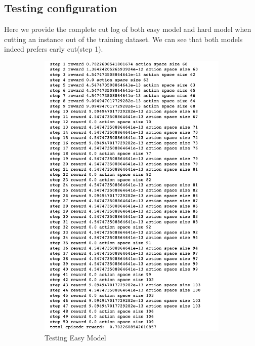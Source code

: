 \documentclass{article}
\begin{document}
\subsection{Testing configuration}
Here we provide the complete cut log of both easy model and hard model when cutting an instance out of the training dataset. We can see that both models indeed prefers early cut(step 1).
\begin{figure}[H]
     \centering
     \begin{subfigure}[b]{0.47\textwidth}
         \centering
         \includegraphics[width=\textwidth]{easy_test.png}
         \caption{Testing Easy Model}
     \end{subfigure} 
    \hfill
     \begin{subfigure}[b]{0.45\textwidth}

\end{subfigure}
\end{figure}
\end{document}
